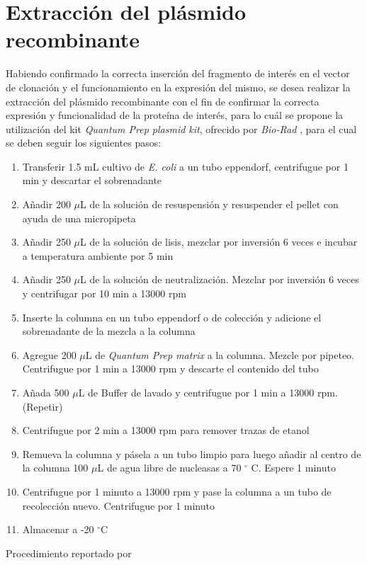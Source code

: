 \documentclass[12pt]{article}
\begin{document}
	\section{Extracción del plásmido recombinante}
		Habiendo confirmado la correcta inserción del fragmento de interés en el vector de clonación y el funcionamiento en la expresión del mismo, se desea realizar la extracción del plásmido recombinante con el fin de confirmar la correcta expresión y funcionalidad de la proteína de interés, para lo cuál se propone la utilización del kit \textit{Quantum Prep plasmid kit}, ofrecido por \textit{Bio-Rad} \cite{biorad}, para el cual se deben seguir los siguientes pasos:
		\begin{enumerate}
			\item Transferir 1.5 mL cultivo de \textit{E. coli} a un tubo  eppendorf, centrifugue por 1 min y descartar el sobrenadante
			\item Añadir 200 $\mu$L de la solución de resuspensión y resuspender el pellet con ayuda de una micropipeta
			\item Añadir 250 $\mu$L de la solución de lisis, mezclar por inversión 6 veces e incubar a temperatura ambiente por 5 min
			\item Añadir 250 $\mu$L de la solución de  neutralización. Mezclar por inversión 6 veces y centrifugar por 10 min a 13000 rpm
			\item Inserte la columna en un tubo eppendorf o de colección y adicione el sobrenadante de la mezcla a la columna
			\item Agregue 200 $\mu$L de \textit{Quantum Prep  matrix} a la columna. Mezcle por pipeteo. Centrifugue por 1 min a 13000 rpm y descarte el contenido del tubo 
			\item Añada 500 $\mu$L de Buffer de lavado y centrifugue por 1 min a 13000 rpm. (Repetir)
			\item Centrifugue por 2 min a 13000 rpm para  remover trazas de etanol
			\item Remueva la columna y pásela a un tubo limpio para luego añadir al centro de la columna 100 $\mu$L  de agua libre de nucleasas a 70 $^\circ$ C. Espere 1 minuto
			\item Centrifugue por 1 minuto a 13000 rpm y pase la columna a un tubo de recolección nuevo. Centrifugue por 1 minuto
			\item Almacenar a -20 $^\circ$C
		\end{enumerate}

		\begin{flushright}
			Procedimiento reportado por \citeauthor{bioradBook}
		\end{flushright}
\end{document}
